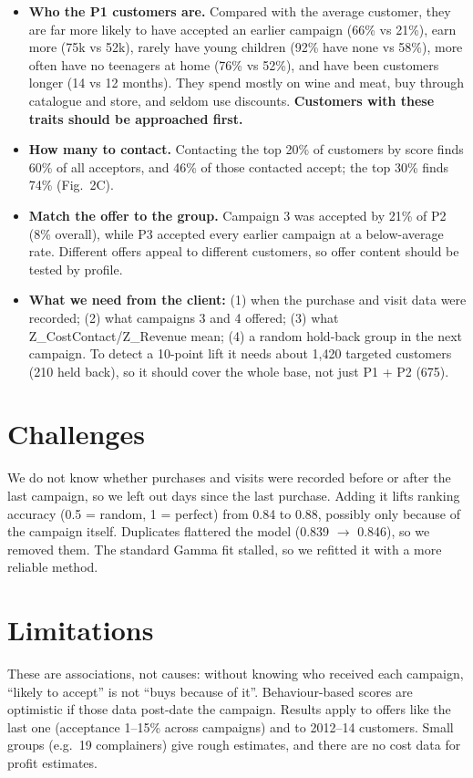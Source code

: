 \documentclass[10pt,letterpaper]{article}
\begin{document}
\begin{itemize}
  \item \textbf{Who the P1 customers are.} Compared with the average customer, they are far more likely to have accepted an earlier campaign (66\% vs 21\%), earn more (75k vs 52k), rarely have young children (92\% have none vs 58\%), more often have no teenagers at home (76\% vs 52\%), and have been customers longer (14 vs 12 months). They spend mostly on wine and meat, buy through catalogue and store, and seldom use discounts. \textbf{Customers with these traits should be approached first.}
  \item \textbf{How many to contact.} Contacting the top 20\% of customers by score finds 60\% of all acceptors, and 46\% of those contacted accept; the top 30\% finds 74\% (Fig.~2C).
  \item \textbf{Match the offer to the group.} Campaign 3 was accepted by 21\% of P2 (8\% overall), while P3 accepted every earlier campaign at a below-average rate. Different offers appeal to different customers, so offer content should be tested by profile.
  \item \textbf{What we need from the client:} (1) when the purchase and visit data were recorded; (2) what campaigns 3 and 4 offered; (3) what Z\_CostContact\slash Z\_Revenue mean; (4) a random hold-back group in the next campaign. To detect a 10-point lift it needs about 1,420 targeted customers (210 held back), so it should cover the whole base, not just P1 + P2 (675).
\end{itemize}

\par\vspace{3pt}\noindent
\begin{minipage}[t]{0.485\linewidth}
\section*{Challenges}
We do not know whether purchases and visits were recorded before or after the last campaign, so we left out days since the last purchase. Adding it lifts ranking accuracy (0.5 = random, 1 = perfect) from 0.84 to 0.88, possibly only because of the campaign itself. Duplicates flattered the model (0.839 $\rightarrow$ 0.846), so we removed them. The standard Gamma fit stalled, so we refitted it with a more reliable method.
\end{minipage}\hfill
\begin{minipage}[t]{0.485\linewidth}
\section*{Limitations}
These are associations, not causes: without knowing who received each campaign, ``likely to accept'' is not ``buys because of it''. Behaviour-based scores are optimistic if those data post-date the campaign. Results apply to offers like the last one (acceptance 1--15\% across campaigns) and to 2012--14 customers. Small groups (e.g.\ 19 complainers) give rough estimates, and there are no cost data for profit estimates.
\end{minipage}
\end{document}
